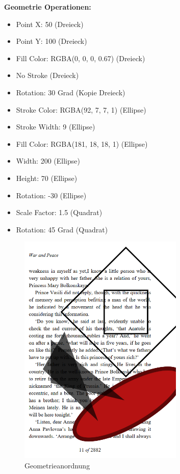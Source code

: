 \textbf{Geometrie Operationen:}
\begin{itemize}
	\item Point X: 50 (Dreieck)
	\item Point Y: 100 (Dreieck)
	\item Fill Color: RGBA(0, 0, 0, 0.67) (Dreieck)
	\item No Stroke (Dreieck)
	\item Rotation: 30 Grad (Kopie Dreieck)
	\item Stroke Color: RGBA(92, 7, 7, 1) (Ellipse) 
	\item Stroke Width: 9 (Ellipse)
	\item Fill Color: RGBA(181, 18, 18, 1) (Ellipse)
	\item Width: 200 (Ellipse)
	\item Height: 70 (Ellipse)
	\item Rotation: -30 (Ellipse)
	\item Scale Factor: 1.5 (Quadrat)
	\item Rotation: 45 Grad (Quadrat)
\end{itemize}

\begin{figure}[!htbp]
	\centering
	\includegraphics[width=0.7\textwidth]{"images/shape-ops.png"}
	\caption{Geometrieanordnung}
	\label{fig:shape-ops}
\end{figure}

